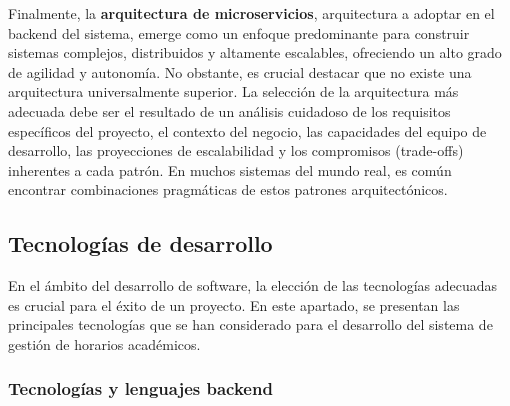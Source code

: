 Finalmente, la \textbf{arquitectura de microservicios}, arquitectura a adoptar en el backend del sistema, emerge como un enfoque predominante para construir sistemas complejos, distribuidos y altamente escalables, ofreciendo un alto grado de agilidad y autonomía. No obstante, es crucial destacar que no existe una arquitectura universalmente superior. La selección de la arquitectura más adecuada debe ser el resultado de un análisis cuidadoso de los requisitos específicos del proyecto, el contexto del negocio, las capacidades del equipo de desarrollo, las proyecciones de escalabilidad y los compromisos (trade-offs) inherentes a cada patrón. En muchos sistemas del mundo real, es común encontrar combinaciones pragmáticas de estos patrones arquitectónicos.

\subsection{Tecnologías de desarrollo}

En el ámbito del desarrollo de software, la elección de las tecnologías adecuadas es crucial para el éxito de un proyecto. En este apartado, se presentan las principales tecnologías que se han considerado para el desarrollo del sistema de gestión de horarios académicos.

\subsubsection{Tecnologías y lenguajes backend}

